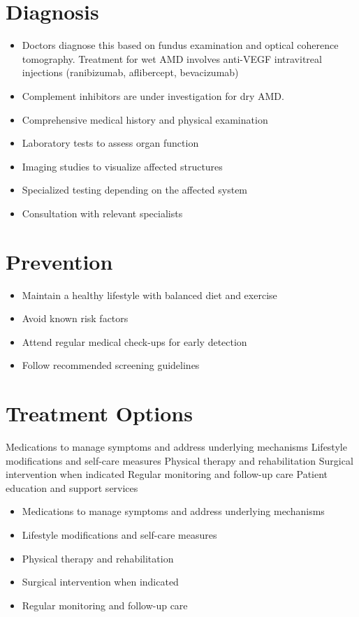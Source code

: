 \section{Diagnosis}
\begin{itemize}[noitemsep]
  \item Doctors diagnose this based on fundus examination and optical coherence tomography. Treatment for wet AMD involves anti-VEGF intravitreal injections (ranibizumab, aflibercept, bevacizumab)
  \item Complement inhibitors are under investigation for dry AMD.
  \item Comprehensive medical history and physical examination
  \item Laboratory tests to assess organ function
  \item Imaging studies to visualize affected structures
  \item Specialized testing depending on the affected system
  \item Consultation with relevant specialists
\end{itemize}
\section{Prevention}
\begin{itemize}[noitemsep]
  \item Maintain a healthy lifestyle with balanced diet and exercise
  \item Avoid known risk factors
  \item Attend regular medical check-ups for early detection
  \item Follow recommended screening guidelines
\end{itemize}
\section{Treatment Options}
Medications to manage symptoms and address underlying mechanisms Lifestyle modifications and self-care measures Physical therapy and rehabilitation Surgical intervention when indicated Regular monitoring and follow-up care Patient education and support services

\begin{itemize}[noitemsep]
  \item Medications to manage symptoms and address underlying mechanisms
  \item Lifestyle modifications and self-care measures
  \item Physical therapy and rehabilitation
  \item Surgical intervention when indicated
  \item Regular monitoring and follow-up care
\end{itemize}
